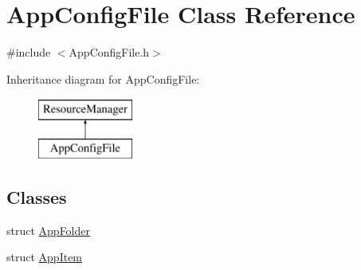 \hypertarget{classAppConfigFile}{}\section{App\+Config\+File Class Reference}
\label{classAppConfigFile}


{\ttfamily \#include $<$App\+Config\+File.\+h$>$}

Inheritance diagram for App\+Config\+File\+:\begin{figure}[H]
\begin{center}
\leavevmode
\includegraphics[height=2.000000cm]{classAppConfigFile}
\end{center}
\end{figure}
\subsection*{Classes}
\begin{DoxyCompactItemize}
\item 
struct \mbox{\hyperlink{structAppConfigFile_1_1AppFolder}{App\+Folder}}
\item 
struct \mbox{\hyperlink{structAppConfigFile_1_1AppItem}{App\+Item}}
\end{DoxyCompactItemize}
